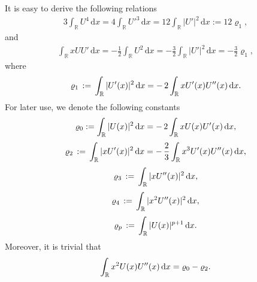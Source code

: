 \documentclass[10pt, reqno]{amsart}
\numberwithin{equation}{section}
\theoremstyle{definition}
\begin{document}
{It is easy to derive the following relations
\begin{align} \label{identities for U}
 3 \int_{{\mathbb R}} U^4 \,{\mathrm d}x = 4\int_{{\mathbb R}} U'^3 \,{\mathrm d}x= 12 \int_{{\mathbb R}} |U'|^2 \,{\mathrm d}x := 12 \varrho_1,
\end{align}
and
\begin{align} \label{identities for U2}
 \int_{{\mathbb R}} xU U' \,{\mathrm d}x = - \frac 12 \int_{{\mathbb R}} U^2 \,{\mathrm d}x= - \frac 32 \int_{{\mathbb R}} |U'|^2 \,{\mathrm d}x = - \frac 32 \varrho_1,
\end{align}
where
\begin{align}
\varrho_1
\,:=\,
\int_{\Bbb R}|U'(x)|^2\,{\mathrm d}x
=
-\,2\int_{\Bbb R}xU'(x)U''(x)\,{\mathrm d}x.
\label{varrho1}
\end{align}
For later use, we denote the following constants
\begin{align}
\varrho_0:=\int_{\Bbb R}|U(x)|^2\,{\mathrm d}x =-\,2\int_{\Bbb R}xU(x)U'(x)\,{\mathrm d}x,
\label{varrho0}
\end{align}
\begin{align}
\varrho_2
\,:=\,
\int_{\Bbb R}|xU'(x)|^2\,{\mathrm d}x
=-\,\frac{2}{3}\int_{\Bbb R}x^3U'(x)U''(x)\,{\mathrm d}x,
\label{varrho2}
\end{align}
\begin{align}
\varrho_3
\,:=\,
\int_{\Bbb R}|xU''(x)|^2\,{\mathrm d}x,
\label{varrho3}
\end{align}
\begin{align}
\varrho_4
\,:=\,
\int_{\Bbb R}|x^2U''(x)|^2\,{\mathrm d}x,
\label{varrho4}
\end{align}
\begin{align}
\varrho_p
\,:=\,
\int_{\Bbb R}|U(x)|^{p+1}\,{\mathrm d}x.
\label{varrhop}
\end{align}
Moreover, it is trivial that
\begin{align}\label{varrho-additional}
\int_{\Bbb R}x^2U(x)U''(x)\,{\mathrm d}x=\varrho_0-\varrho_2.
\end{align}



}
\end{document}
